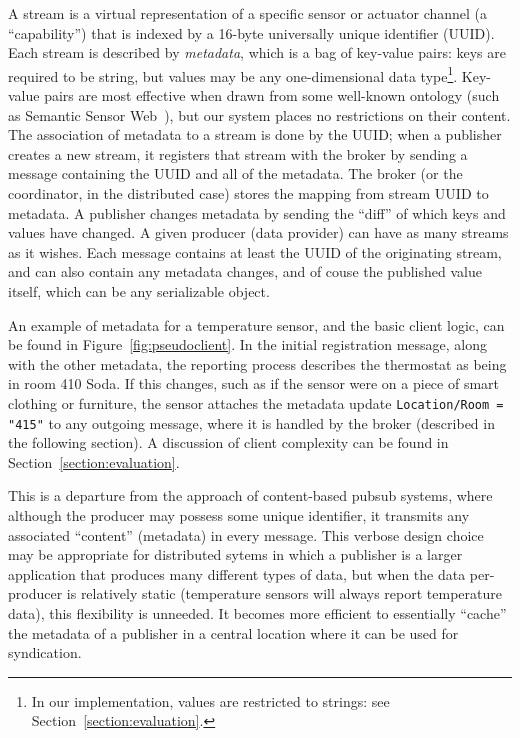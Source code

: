 A stream is a virtual representation of a specific sensor or actuator channel (a ``capability'') that is indexed by a 16-byte universally unique identifier (UUID).
Each stream is described by \emph{metadata}, which is a bag of key-value pairs: keys are required to be string, but values may be any one-dimensional data type\footnote{In our implementation, values are restricted to strings: see Section~\ref{section:evaluation}.}.
Key-value pairs are most effective when drawn from some well-known ontology (such as Semantic Sensor Web~\cite{sheth2008semantic}), but our system places no restrictions on their content.
The association of metadata to a stream is done by the UUID; when a publisher creates a new stream, it registers that stream with the broker by sending a message containing the UUID and all of the metadata.
The broker (or the coordinator, in the distributed case) stores the mapping from stream UUID to metadata.
A publisher changes metadata by sending the ``diff'' of which keys and values have changed.
A given producer (data provider) can have as many streams as it wishes.
Each message contains at least the UUID of the originating stream, and can also contain any metadata changes, and of couse the published value itself, which can be any serializable object.

An example of metadata for a temperature sensor, and the basic client logic, can be found in Figure~\ref{fig:pseudoclient}.
In the initial registration message, along with the other metadata, the reporting process describes the thermostat as being in room 410 Soda.
If this changes, such as if the sensor were on a piece of smart clothing or furniture, the sensor attaches the metadata update \lstinline{Location/Room = "415"} to any outgoing message, where it is handled by the broker (described in the following section).
A discussion of client complexity can be found in Section~\ref{section:evaluation}.

This is a departure from the approach of content-based pubsub systems, where although the producer may possess some unique identifier, it transmits any associated ``content'' (metadata) in every message.
This verbose design choice may be appropriate for distributed sytems in which a publisher is a larger application that produces many different types of data, but when the data per-producer is relatively static (temperature sensors will always report temperature data), this flexibility is unneeded.
It becomes more efficient to essentially ``cache'' the metadata of a publisher in a central location where it can be used for syndication.

